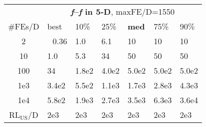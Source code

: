 \begin{tabular}{c|llllll}
 & \multicolumn{6}{|c}{\textbf{\textit{f}\raisebox{-0.35ex}{1}--\textit{f}\raisebox{-0.35ex}{24} in 5-D}, maxFE/D=1550}\\
\#FEs/D & best & 10\% & 25\% & \textbf{med} & 75\% & 90\%\\
2 & ~\,0.36 & \hspace*{1ex}1.0 & \hspace*{1ex}6.1 & 10 & 10 & 10\\
10 & \hspace*{1ex}1.0 & \hspace*{1ex}5.3 & 34 & 50 & 50 & 50\\
100 & 34 & 1.8e2 & 4.0e2 & 5.0e2 & 5.0e2 & 5.0e2\\
1e3 & 3.4e2 & 5.5e2 & 1.1e3 & 1.7e3 & 2.8e3 & 4.3e3\\
1e4 & 5.8e2 & 1.9e3 & 2.7e3 & 3.5e3 & 6.3e3 & 3.6e4\\
$\text{RL}_{\text{US}}$/D & 2e3 & 2e3 & 2e3 & 2e3 & 2e3 & 2e3
\end{tabular}
